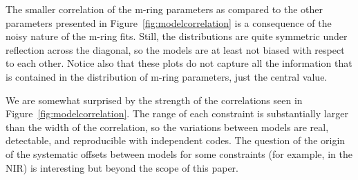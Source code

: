 The smaller correlation of the m-ring parameters as compared to the other parameters presented in Figure~\ref{fig:modelcorrelation} is a consequence of the noisy nature of the m-ring fits.
Still, the distributions are quite symmetric under reflection across the diagonal, so the models are at least not biased with respect to each other.
Notice also that these plots do not capture all the information that is contained in the distribution of m-ring parameters, just the central value.

We are somewhat surprised by the strength of the correlations seen in Figure~\ref{fig:modelcorrelation}.
The range of each constraint is substantially larger than the width of the correlation, so the variations between models are real, detectable, and reproducible with independent codes.
The question of the origin of the systematic offsets between models for some constraints (for example, in the NIR) is interesting but beyond the scope of this paper.

